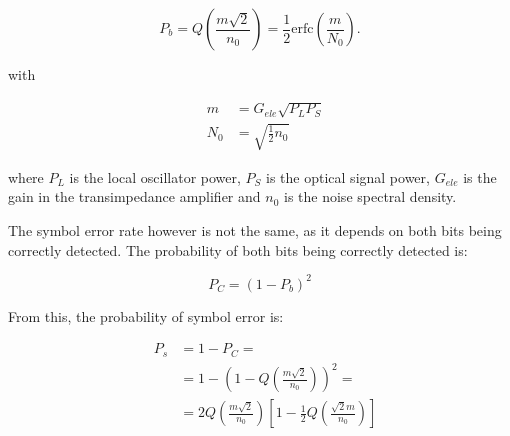 


\begin{equation}\label{eq:berBPSK}
P_b= Q\left({\frac{m\sqrt{2}}{n_0}}\right) = \frac{1}{2} \text{erfc}\left({\frac{m}{N_0}}\right).
\end{equation}

with


\begin{eqnarray}
&m &= G_{ele} \sqrt{P_L P_S} \\
&N_0 &= \sqrt{\frac{1}{2} n_0}
\end{eqnarray}

where $P_L$ is the local oscillator power, $P_S$ is the optical signal power, $G_{ele}$ is the gain in the transimpedance amplifier and $n_0$ is the noise spectral density.

The symbol error rate however is not the same, as it depends on both bits being correctly detected. The probability of both bits being correctly detected is:

\begin{equation}
P_C = (1 - P_b)^2
\end{equation}

From this, the probability of symbol error is:

\begin{eqnarray}
&P_s &= 1-P_C =\nonumber \\
&	   &= 1 - \left(1 - Q \left({\frac{m \sqrt{2}}{n_0}}\right)\right)^2 = \nonumber \\
&	   &= 2 Q\left({\frac{m \sqrt{2}}{n_0}}\right)\left[1-\frac{1}{2} Q \left({\frac{\sqrt{2} m}{n_0}}\right)\right]
\end{eqnarray}

